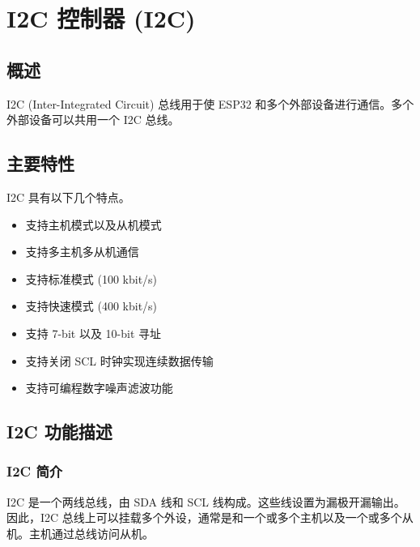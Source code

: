 \documentclass[main\_\_CN.tex]{subfiles}
\begin{document}
\setchineseformatting


\ifglobal
\else
    \listoftodos
    {\let\clearpage\relax \listofdonetodos}
    \tableofcontents
\fi



\hypertarget{i2c}{}
\chapter{I2C 控制器 (I2C)}
\label{mod:i2c}

\section{概述}

I2C (Inter-Integrated Circuit) 总线用于使 ESP32 和多个外部设备进行通信。多个外部设备可以共用一个 I2C 总线。

\section{主要特性}

I2C 具有以下几个特点。

\begin{itemize}
    \item 支持主机模式以及从机模式
    \item 支持多主机多从机通信
    \item 支持标准模式 (100 kbit/s)
    \item 支持快速模式 (400 kbit/s)
    \item 支持 7-bit 以及 10-bit 寻址
    \item 支持关闭 SCL 时钟实现连续数据传输
    \item 支持可编程数字噪声滤波功能
\end{itemize}

\section{I2C 功能描述}

\subsection{I2C 简介}
I2C 是一个两线总线，由 SDA 线和 SCL 线构成。这些线设置为漏极开漏输出。因此，I2C 总线上可以挂载多个外设，通常是和一个或多个主机以及一个或多个从机。主机通过总线访问从机。
\end{document}
